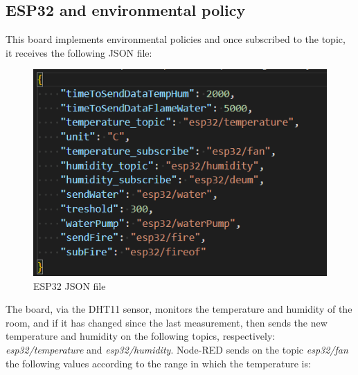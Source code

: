 \documentclass[]{scrartcl}
\begin{document}
\subsection{ESP32 and environmental policy}
This board implements environmental policies and once subscribed to the topic, it receives the following JSON file:
\begin{figure}[h]
	\centering
	\includegraphics[width=\textwidth]{esp32-config.png}
	\caption{ESP32 JSON file}
\end{figure}
\newpage \noindent
The board, via the DHT11 sensor, monitors the temperature and humidity of the room, and if it has changed since the last measurement, then sends the new temperature and humidity on the following topics, respectively: \textit{esp32/temperature} and \textit{esp32/humidity}. Node-RED sends on the topic \textit{esp32/fan} the following values according to the range in which the temperature is:
\end{document}
